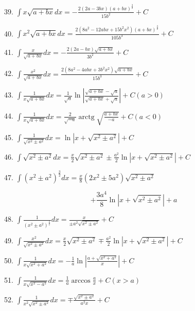 \documentclass[lang=cn,newtx,10pt,scheme=chinese]{elegantbook}
\begin{document}
39. \(\int x\sqrt{a + {bx}}{dx} = - \frac{2\left( {{2a} - {3bx}}\right) {\left( a + bx\right) }^{\frac{3}{2}}}{{15}{b}^{2}} + C\)

40. \(\int {x}^{2}\sqrt{a + {bx}}{dx} = \frac{2\left( {8{a}^{2} - {12abx} + {15}{b}^{2}{x}^{2}}\right) {\left( a + bx\right) }^{\frac{3}{2}}}{{105}{b}^{3}} + C\)

41. \(\int \frac{x}{\sqrt{a + {bx}}}{dx} = - \frac{2\left( {{2a} - {bx}}\right) \sqrt{a + {bx}}}{3{b}^{2}} + C\)

42. \(\int \frac{{x}^{2}}{\sqrt{a + {bx}}}{dx} = \frac{2\left( {8{a}^{2} - {4abx} + 3{b}^{2}{x}^{2}}\right) \sqrt{a + {bx}}}{{15}{b}^{3}} + C\)

43. \(\int \frac{1}{x\sqrt{a + {bx}}}{dx} = \frac{1}{\sqrt{a}}\ln \left| \frac{\sqrt{a + {bx}} - \sqrt{a}}{\sqrt{a + {bx}} + \sqrt{a}}\right| + C\left( {a > 0}\right)\)

44. \(\int \frac{1}{x\sqrt{a + {bx}}}{dx} = \frac{2}{\sqrt{-a}}\operatorname{arctg}\sqrt{\frac{a + {bx}}{-a}} + C\left( {a < 0}\right)\)

45. \(\int \frac{1}{\sqrt{{x}^{2} \pm {a}^{2}}}{dx} = \ln \left| {x + \sqrt{{x}^{2} \pm {a}^{2}}}\right| + C\)

46. \(\int \sqrt{{x}^{2} \pm {a}^{2}}{dx} = \frac{x}{2}\sqrt{{x}^{2} \pm {a}^{2}} \pm \frac{{a}^{2}}{2}\ln \left| {x + \sqrt{{x}^{2} \pm {a}^{2}}}\right| + C\)

47. \(\int {\left( {x}^{2} \pm {a}^{2}\right) }^{\frac{3}{2}}{dx} = \frac{x}{8}\left( {2{x}^{2} \pm 5{a}^{2}}\right) \sqrt{{x}^{2} \pm {a}^{2}}\)

\[
+ \frac{3{a}^{4}}{8}\ln \left| {x + \sqrt{{x}^{2} \pm {a}^{2}}}\right| + a
\]

48. \(\int \frac{1}{{\left( {x}^{2} \pm {a}^{2}\right) }^{\frac{3}{2}}}{dx} = \frac{x}{\pm {a}^{2}\sqrt{{x}^{2} \pm {a}^{2}}} + C\)

49. \(\int \frac{{x}^{2}}{\sqrt{{x}^{2} \pm {a}^{2}}}{dx} = \frac{x}{2}\sqrt{{x}^{2} \pm {a}^{2}} \mp \frac{{a}^{2}}{2}\ln \left| {x + \sqrt{{x}^{2} \pm {a}^{2}}}\right| + C\)

50. \(\int \frac{1}{x\sqrt{{x}^{2} + {a}^{2}}}{dx} = - \frac{1}{a}\ln \left| \frac{a + \sqrt{{x}^{2} + {a}^{2}}}{x}\right| + C\)

51. \(\int \frac{1}{x\sqrt{{x}^{2} - {a}^{2}}}{dx} = \frac{1}{a}\arccos \frac{a}{x} + C\left( {x > a}\right)\)

52. \(\int \frac{1}{{x}^{2}\sqrt{{x}^{2} \pm {a}^{2}}}{dx} = \mp \frac{\sqrt{{x}^{2} \pm {a}^{2}}}{{a}^{2}x} + C\)
\end{document}
